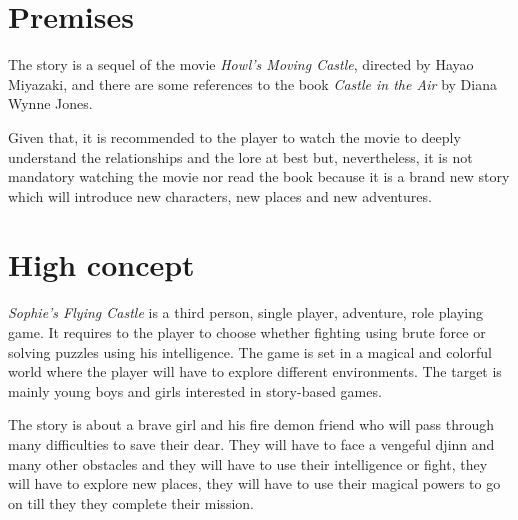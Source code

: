 \section{Premises}

The story is a sequel of the movie \textit{Howl’s Moving Castle}, directed by Hayao Miyazaki, and there are some references to the book \textit{Castle in the Air} by Diana Wynne Jones.

Given that, it is recommended to the player to watch the movie to deeply understand the relationships and the lore at best but, nevertheless, it is not mandatory watching the movie nor read the book because it is a brand new story which will introduce new characters, new places and new adventures.

\section{High concept}

\textit{Sophie's Flying Castle} is a third person, single player, adventure, role playing game. It requires to the player to choose whether fighting using brute force or solving puzzles using his intelligence. The game is set in a magical and colorful world where the player will have to explore different environments. 
The target is mainly young boys and girls interested in story-based games.

The story is about a brave girl and his fire demon friend who will pass through many difficulties to save their dear. They will have to face a vengeful djinn and many other obstacles and they will have to use their intelligence or fight, they will have to explore new places, they  will have to use their magical powers to go on till they they complete their mission. 
